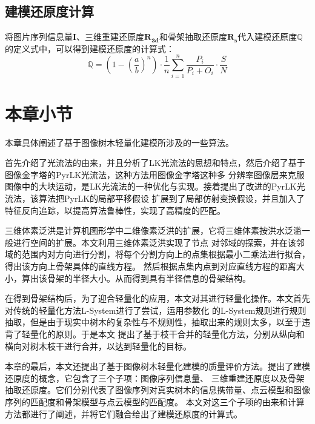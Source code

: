 \subsection{建模还原度计算}
将图片序列信息量$\mathbf{I}$、三维重建还原度$\mathbf{R_{3d}}$和骨架抽取还原度$\mathbf{R_s}$代入建模还原度$\mathbb{Q}$
的定义式中，可以得到建模还原度的计算式：\\
\begin{equation}
	\mathbb{Q}= (1-(\frac{a}{b})^n)\cdot \frac{1}{n}\sum_{i=1}^n \frac{P_i}{P_i+O_i} \cdot \frac{S}{N}
\end{equation}

\clearpage
\section{本章小节}
\label{sec:conclusion}
本章具体阐述了基于图像树木轻量化建模所涉及的一些算法。

首先介绍了光流法的由来，并且分析了LK光流法的思想和特点，然后介绍了基于图像金字塔的PyrLK光流法，这种方法用图像金字塔这种多
分辨率图像层来克服图像中的大块运动，是LK光流法的一种优化与实现。接着提出了改进的PyrLK光流法，该算法把PyrLK的局部平移假设
扩展到了局部仿射变换假设，并且加入了特征反向追踪，以提高算法鲁棒性，实现了高精度的匹配。

三维体素泛洪是计算机图形学中二维像素泛洪的扩展，它将三维体素按洪水泛滥一般进行空间的扩展。本文利用三维体素泛洪实现了节点
对邻域的探索，并在该邻域的范围内对方向进行分割，将每个分割方向上的点集根据最小二乘法进行拟合，得出该方向上骨架具体的直线方程。
然后根据点集内点到对应直线方程的距离大小，算出该骨架的半径大小。从而得到具有半径信息的骨架结构。

在得到骨架结构后，为了迎合轻量化的应用，本文对其进行轻量化操作。本文首先对传统的轻量化方法L-System进行了尝试，运用参数化
的L-System规则进行规则抽取，但是由于现实中树木的复杂性与不规则性，抽取出来的规则太多，以至于违背了轻量化的原则。于是本文
提出了基于枝干合并的轻量化方法，分别从纵向和横向对树木枝干进行合并，以达到轻量化的目标。

本章的最后，本文还提出了基于图像树木轻量化建模的质量评价方法。提出了建模还原度的概念，它包含了三个子项：图像序列信息量、
三维重建还原度以及骨架抽取还原度。它们分别代表了图像序列对真实树木的信息携带量、点云模型和图像序列的匹配度和骨架模型与点云模型的匹配度。
本文对这三个子项的由来和计算方法都进行了阐述，并将它们融合给出了建模还原度的计算式。
